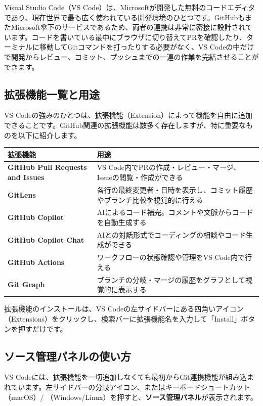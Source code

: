 Visual Studio Code（VS Code）は、Microsoftが開発した無料のコードエディタであり、現在世界で最も広く使われている開発環境のひとつです。GitHubもまたMicrosoft傘下のサービスであるため、両者の連携は非常に密接に設計されています。コードを書いている最中にブラウザに切り替えてPRを確認したり、ターミナルに移動してGitコマンドを打ったりする必要がなく、VS Codeの中だけで開発からレビュー、コミット、プッシュまでの一連の作業を完結させることができます。

\subsection{拡張機能一覧と用途}

VS Codeの強みのひとつは、拡張機能（Extension）によって機能を自由に追加できることです。GitHub関連の拡張機能は数多く存在しますが、特に重要なものを以下に紹介します。

\begin{table}[h]
\centering
\begin{tabular}{ll}
\hline
拡張機能 & 用途 \\
\hline
\textbf{GitHub Pull Requests and Issues} & VS Code内でPRの作成・レビュー・マージ、Issueの閲覧・作成ができる \\
\textbf{GitLens} & 各行の最終変更者・日時を表示し、コミット履歴やブランチ比較を視覚的に行える \\
\textbf{GitHub Copilot} & AIによるコード補完。コメントや文脈からコードを自動生成する \\
\textbf{GitHub Copilot Chat} & AIとの対話形式でコーディングの相談やコード生成ができる \\
\textbf{GitHub Actions} & ワークフローの状態確認や管理をVS Code内で行える \\
\textbf{Git Graph} & ブランチの分岐・マージの履歴をグラフとして視覚的に表示する \\
\hline
\end{tabular}
\end{table}

拡張機能のインストールは、VS Codeの左サイドバーにある四角いアイコン（Extensions）をクリックし、検索バーに拡張機能名を入力して「Install」ボタンを押すだけです。

\subsection{ソース管理パネルの使い方}

VS Codeには、拡張機能を一切追加しなくても最初からGit連携機能が組み込まれています。左サイドバーの分岐アイコン、またはキーボードショートカット （macOS）/ （Windows/Linux）を押すと、\textbf{ソース管理パネル}が表示されます。

